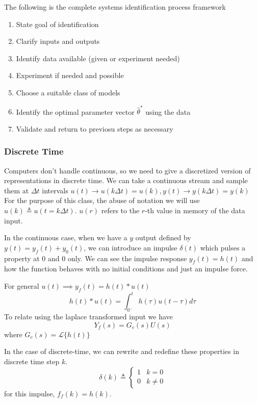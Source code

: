 \documentclass[11pt]{article}
\begin{document}
The following is the complete systems identification process framework
\begin{enumerate}
    \item State goal of identification
    \item Clarify inputs and outputs
    \item Identify data available (given or experiment needed)
    \item Experiment if needed and possible
    \item Choose a suitable class of models
    \item Identify the optimal parameter vector $\hat{\theta}^*$ using the data
    \item Validate and return to previosu steps as necessary
\end{enumerate}

\subsubsection{Discrete Time}
Computers don't handle continuous, so we need to give a discretized version of representations in discrete time.
We can take a continuous stream and sample them at $\Delta t$ intervals $u(t) \to u(k \Delta t) = u(k), y(t) \to y(k \Delta t) = y(k)$
For the purpose of this class, the abuse of notation we will use $u(k)\triangleq u(t=k \Delta t)$.
$u(r)$ refers to the $r$-th value in memory of the data input.

In the continuous case, when we have a $y$ output defined by $y(t) = y_f(t) + y_0(t)$, we can introduce an impulse $\delta(t)$ which pulses a property at 0 and 0 only.
We can see the impulse response $y_f(t) = h(t)$ and how the function behaves with no initial conditions and just an impulse force.

For general $u(t) \implies y_f(t) = h(t) \ast u(t) $
\begin{equation}
    h(t) \ast u(t) = \int_{0^-}^{t} h(\tau) u(t-\tau) d \tau
\end{equation}
To relate using the laplace transformed input we have
\begin{equation}
    Y_f (s) = G_c (s) U(s)
\end{equation}
where $G_c(s) = \mathcal{L}\{ h(t) \}$

In the case of discrete-time, we can rewrite and redefine these properties in discrete time step $k$.
\begin{equation}
    \delta (k) \triangleq 
    \begin{cases}
        1 & k = 0 \\ 0 & k \neq 0
    \end{cases}
\end{equation}
for this impulse, $f_f(k) = h(k)$.
\end{document}
